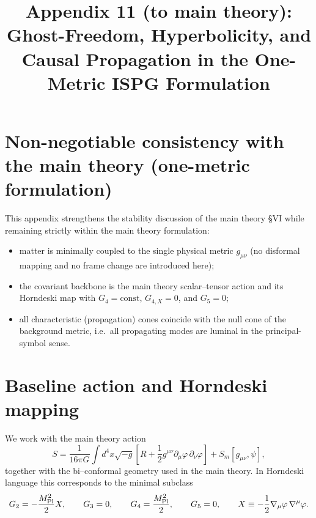 \documentclass[11pt]{article}
\title{Appendix 11 (to main theory): Ghost-Freedom, Hyperbolicity, and Causal Propagation in the One-Metric ISPG Formulation}
\author{}
\date{}
\begin{document}
\let\phi\varphi
\maketitle

\section*{Non-negotiable consistency with the main theory (one-metric formulation)}
This appendix strengthens the stability discussion of the main theory \S VI while remaining strictly within the main theory formulation:
\begin{itemize}
\item matter is minimally coupled to the single physical metric $g_{\mu\nu}$ (no disformal mapping and no frame change are introduced here);
\item the covariant backbone is the main theory scalar--tensor action and its Horndeski map with $G_4=\mathrm{const}$, $G_{4,X}=0$, and $G_5=0$;
\item all characteristic (propagation) cones coincide with the null cone of the background metric, i.e.\ all propagating modes are luminal in the principal-symbol sense.
\end{itemize}

\section{Baseline action and Horndeski mapping}\label{sec:action_app11}
We work with the main theory action
\begin{equation}
S=\frac{1}{16\pi G}\int d^4x\sqrt{-g}\left[R+\frac12 g^{\mu\nu}\partial_\mu\phi\,\partial_\nu\phi\right]+S_m[g_{\mu\nu},\psi],
\label{eq:action_app11}
\end{equation}
together with the bi--conformal geometry used in the main theory. In Horndeski language this corresponds to the minimal subclass
\begin{equation}
G_2 = -\frac{M_{\rm Pl}^2}{2}X,\qquad
G_3=0,\qquad
G_4=\frac{M_{\rm Pl}^2}{2},\qquad
G_5=0,
\qquad
X\equiv -\frac12 \nabla_\mu\phi\,\nabla^\mu\phi.
\label{eq:horndeski_app11}
\end{equation}
\end{document}
